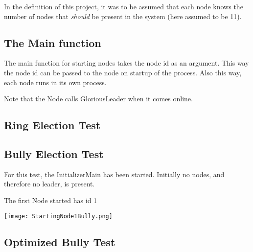 In the definition of this project, it was to be assumed that each node knows the number of nodes that \textit{should} be present in the system (here assumed to be 11).

\subsection{The Main function}
The main function for starting nodes takes the node id as an argument. This way the node id can be passed to the node on startup of the process. Also this way, each node runs in its own process.

\begin{center}
\end{center}

Note that the Node calls GloriousLeader when it comes online. 

\subsection{Ring Election Test}

\subsection{Bully Election Test}
For this test, the InitializerMain has been started. Initially no nodes, and therefore no leader, is present. 

The first Node started has id 1
\begin{center}
	\texttt{[image: StartingNode1Bully.png]}
\end{center}


\subsection{Optimized Bully Test}